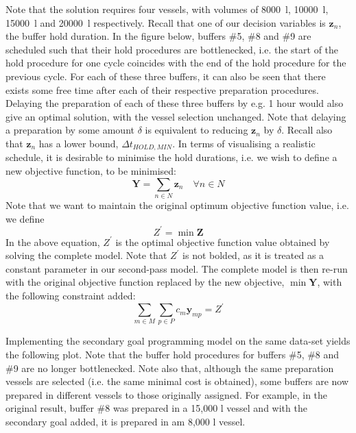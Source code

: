 Note that the solution requires four vessels, with volumes of
\SI{8000}{\litre}, \SI{10000}{\litre}, \SI{15000}{\litre} and
\SI{20000}{\litre} respectively.  
Recall that one of our decision variables is $\boldsymbol{z}_{n}$, the buffer
hold duration.
In the figure below, buffers \#5, \#8 and \#9 are scheduled such that their 
hold procedures are bottlenecked, i.e. the start of the hold procedure for one
cycle coincides with the end of the hold procedure for the previous cycle.
For each of these three buffers, it can also be seen that there exists some
free time after each of their respective preparation procedures.
Delaying the preparation of each of these three buffers by e.g. 1 hour would
also give an optimal solution, with the vessel selection unchanged.
Note that delaying a preparation by some amount $\delta$ is equivalent to 
reducing $\boldsymbol{z}_{n}$ by $\delta$.
Recall also that $\boldsymbol{z}_{n}$ has a lower bound, 
$\Delta t_{\mathit{HOLD,MIN}}$.
In terms of visualising a realistic schedule, it is desirable to minimise the
hold durations, i.e. we wish to define a new objective function, to be
minimised:
\begin{equation}
    \boldsymbol{Y} = \sum_{n \in N} \boldsymbol{z}_{n} \quad \forall n \in N
    \label{eq.objfn2}
\end{equation}
Note that we want to maintain the original optimum objective function value,
i.e. we define
\begin{equation}
    Z^{\prime} = \min \boldsymbol{Z}
\end{equation}
In the above equation, $Z^{\prime}$ is the optimal objective function value obtained by solving
the complete model.
Note that $Z^{\prime}$ is not bolded, as it is treated as a constant parameter
in our second-pass model.
The complete model is then re-run with the original objective function replaced
by the new objective, $\min \boldsymbol{Y}$, with the following constraint
added:
\begin{equation}
    \sum_{m \in M} \sum_{p \in P} c_m \boldsymbol{y}_{mp} = Z^{\prime}
    \label{eq.constr10}
\end{equation}

Implementing the secondary goal programming model on the same data-set yields
the following plot.
Note that the buffer hold procedures for buffers \#5, \#8 and \#9 are no longer
bottlenecked.
Note also that, although the same preparation vessels are selected (i.e. the
same minimal cost is obtained), some buffers are now prepared in different
vessels to those originally assigned.
For example, in the original result, buffer \#8 was prepared in a 15,000 l
vessel and with the secondary goal added, it is prepared in am 8,000 l vessel.

